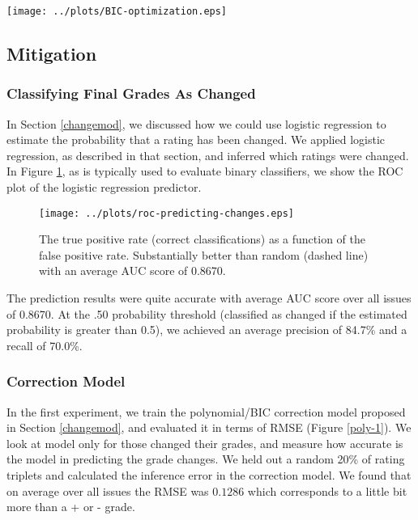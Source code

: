 \begin{figure*}[ht!]
\hspace{-7em}
    \texttt{[image: ../plots/BIC-optimization.eps]}
      \caption{We plot the difference between ratings and the median (X-axis), and the change in rating (Y-axis). We overlay the optimal polynomial model to represent the relationship $f(x) = y$. Below each plot, is the BIC objective function showing how we picked an optimal degree of polynomial.}
      \label{opt-1}
\end{figure*}

\subsection{Mitigation}

\subsubsection{Classifying Final Grades As Changed}
In Section \ref{changemod}, we discussed how we could use logistic regression to estimate the probability that a rating has been changed.
We applied logistic regression, as described in that section, and inferred which ratings were changed.
In Figure \ref{change-pred-1}, as is typically used to evaluate binary classifiers, we show the ROC plot of the logistic regression predictor.
\begin{figure}[h]
\centering
    \texttt{[image: ../plots/roc-predicting-changes.eps]}
      \caption{The true positive rate (correct classifications) as a function of the false positive rate. Substantially better than random (dashed line) with an average AUC score of 0.8670.}
      \label{change-pred-1}
\end{figure}
The prediction results were quite accurate with average AUC score over all issues of 0.8670.
At the .50 probability threshold (classified as changed if the estimated probability is greater than 0.5), we achieved an average precision of 84.7\% and a recall of 70.0\%.

\subsubsection{Correction Model}
In the first experiment, we train the polynomial/BIC correction model proposed in Section \ref{changemod}, and evaluated it in terms of RMSE (Figure \ref{poly-1}).
We look at model only for those changed their grades, and measure how accurate is the model in predicting the grade changes.
We held out a random 20\% of rating triplets and calculated the inference error in the correction model.
We found that on average over all issues the RMSE was $0.1286$ which corresponds to a little bit more than a + or - grade.

